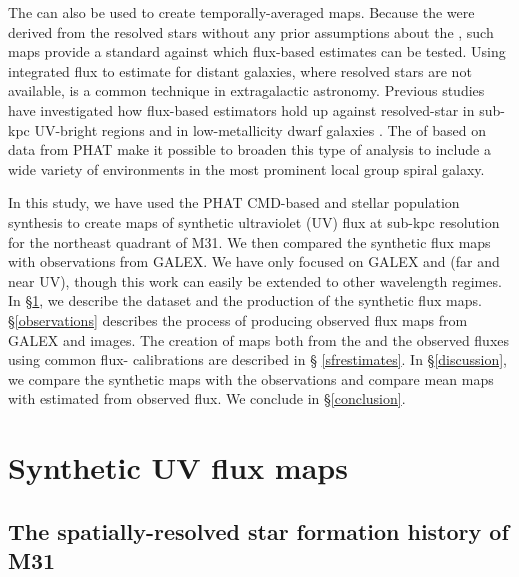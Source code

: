 \documentclass[iop, tighten]{emulateapj}
\begin{document}
The \citet{Lewis:2014}  can also be used to create temporally-averaged
\sfr{} maps. Because the  were derived from the resolved stars without
any prior assumptions about the , such maps provide a standard against
which flux-based \sfr{} estimates \citep[e.g., using any of the calibrations
from][]{Kennicutt:2012} can be tested. Using integrated flux to estimate
 for distant galaxies, where resolved stars are not available, is a
common technique in extragalactic astronomy. Previous studies have investigated
how flux-based \sfr{} estimators hold up against resolved-star  in
sub-kpc UV-bright regions \citep{Simones:2014} and in low-metallicity dwarf
galaxies \citep{McQuinn:2014}. The  of \citet{Lewis:2014} based on data
from PHAT make it possible to broaden this type of analysis to include a wide
variety of environments in the most prominent local group spiral galaxy.

In this study, we have used the PHAT CMD-based  and stellar population
synthesis to create maps of synthetic ultraviolet (UV) flux at sub-kpc
resolution for the northeast quadrant of M31. We then compared the synthetic
flux maps with observations from GALEX. We have only focused on GALEX \fuv{}
and \nuv{} (far and near UV), though this work can easily be extended to other
wavelength regimes. In \S \ref{syntheticfluxmaps}, we describe the \sfh{}
dataset and the production of the synthetic flux maps. \S \ref{observations}
describes the process of producing observed flux maps from GALEX \fuv{} and
\nuv{} images. The creation of \sfr{} maps both from the  and the
observed fluxes using common flux-\sfr{} calibrations are described in \S
\ref{sfrestimates}. In \S \ref{discussion}, we compare the synthetic maps with
the observations and compare mean \sfr{} maps with  estimated from
observed flux. We conclude in \S \ref{conclusion}.








\section{Synthetic UV flux maps}\label{syntheticfluxmaps}



\subsection{The spatially-resolved star formation history of M31}
\end{document}
